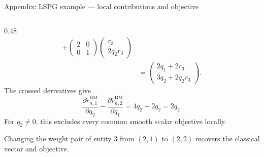 \documentclass[aspectratio=169]{beamer}
\begin{document}
\begin{frame}{Appendix: LSPG example --- local contributions and objective}
\begin{columns}[T,onlytextwidth]
\begin{column}{0.48\textwidth}
\[\begin{aligned}
  +\begin{pmatrix}2&0\\0&1\end{pmatrix}
    \begin{pmatrix}r_3\\2q_2r_3\end{pmatrix}\\[3pt]
 &=\begin{pmatrix}2q_1+2r_3\\3q_2+2q_2r_3\end{pmatrix}.
\end{aligned}
\]
The crossed derivatives give
\[
  \frac{\partial\widetilde r_{n,1}^{\mathrm{BM}}}{\partial q_2}
  -\frac{\partial\widetilde r_{n,2}^{\mathrm{BM}}}{\partial q_1}
  =4q_2-2q_2=2q_2.
\]
For $q_2\ne0$, this excludes every common smooth scalar objective locally.\par\vspace{0.5em}
Changing the weight pair of entity 3 from $(2,1)$ to $(2,2)$ recovers the classical vector and objective.
\end{column}
\end{columns}
\vfill\hfill\hyperlink{bmecsw-lspg-example}{}
\end{frame}
\end{document}
